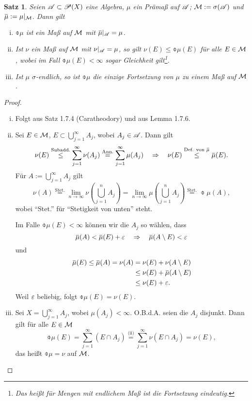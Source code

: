 \documentclass[
 a4paper,
 12pt,
 parskip=half
 ]{scrreprt}
\theoremstyle{plain}
\newtheorem{thm}{Satz}[section] %
\theoremstyle{definition}
\numberwithin{equation}{section}
\begin{document}
\begin{thm}
 Seien $\mathscr{A} \subset \mathscr{P}(X)$ eine Algebra, $\mu$ ein Prämaß auf $\mathscr{A}$; $\mathcal{M} := \sigma(\mathscr{A})$ und $\obar{\mu} := \mu|_\meas$. Dann gilt
 \begin{enumerate}[(i)]
  \item $\obar{\mu}$ ist ein Maß auf $\mathcal{M}$ mit $\obar{\mu}|_\mA = \mu$.
  \item Ist $\nu$ ein Maß auf $\mathcal{M}$ mit $\nu |_{\mathscr{A}} = \mu$, so gilt $\nu(E) \le \obar{\mu}(E)$ für alle $E \in \mathcal{M}$, wobei im Fall $\obar{\mu}(E) < \infty$ sogar Gleichheit gilt\footnote{Das heißt für Mengen mit endlichem Maß ist die Fortsetzung eindeutig.}.
  \item Ist $\mu$ $\sigma$-endlich, so ist $\obar{\mu}$ die \emph{einzige} Fortsetzung von $\mu$ zu einem Maß auf $\mathcal{M}$.
 \end{enumerate}
\end{thm}

\begin{proof}
 \begin{enumerate}[(i)]
  \item Folgt aus Satz 1.7.4 (Caratheodory) und aus Lemma 1.7.6.
  \item Sei $E \in \mathcal{M}$, $E \subset \bigcup_{j=1}^\infty A_j$, wobei $A_j \in \mathscr{A}$. Dann gilt
  \[ \nu(E) \overset{\text{Subadd.}}{\le} \sum_{j=1}^\infty \nu(A_j) \overset{\text{Ann.}}{=} \sum_{j=1}^\infty \mu(A_j) \qRq \nu(E) \overset{\text{Def. von }\obar{\mu}}{\le} \obar{\mu}(E). \]
  Für $A := \bigcup_{j=1}^\infty A_j$ gilt
  \[ \nu(A) \overset{\text{Stet.}}{=} \lim_{n \to \infty} \nu \left( \bigcup_{j=1}^n A_j \right) = \lim_{n \to \infty} \mu \left( \bigcup_{j=1}^n A_j \right) \overset{\text{Stet.}}{=} \obar{\mu}(A), \]
  wobei ``Stet.'' für ``Stetigkeit von unten'' steht. 
  
  Im Falle $\obar{\mu}(E) < \infty$ können wir die $A_j$ so wählen, dass
  \[ \obar{\mu}(A) < \obar{\mu}(E) + \eps \qRq \obar{\mu}( A \setminus E ) < \eps \]
  und
  \begin{align*}
   \obar{\mu}(E) \le \obar{\mu}(A) = \nu(A) &= \nu(E) + \nu(A \setminus E) \\
   &\le \nu(E) + \obar{\mu}(A \setminus E) \\
   &\le \nu(E) + \eps.
  \end{align*}
  Weil $\varepsilon$ beliebig, folgt $\obar{\mu}(E) = \nu(E)$.
  \item Sei $X = \bigcup_{j=1}^\infty A_j$, wobei $\mu(A_j) < \infty$. O.B.d.A. seien die $A_j$ disjunkt. Dann gilt für alle $E \in \mathcal{M}$
  \[ \obar{\mu}(E) = \sum_{j=1}^\infty (E \cap A_j) \overset{\text{(ii)}}{=} \sum_{j=1}^\infty \nu(E \cap A_j) = \nu(E), \]
  das heißt $\obar{\mu} = \nu$ auf $\mathcal{M}$. \qedhere
 \end{enumerate}
\end{proof}
\end{document}
